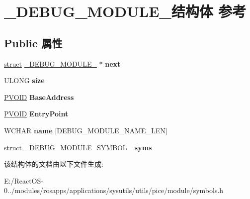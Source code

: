 \hypertarget{struct___d_e_b_u_g___m_o_d_u_l_e__}{}\section{\+\_\+\+D\+E\+B\+U\+G\+\_\+\+M\+O\+D\+U\+L\+E\+\_\+结构体 参考}
\label{struct___d_e_b_u_g___m_o_d_u_l_e__}
\subsection*{Public 属性}
\begin{DoxyCompactItemize}
\item 
\mbox{\label{struct___d_e_b_u_g___m_o_d_u_l_e___aa5464fefbaf71e010d2a32c072de102d}} 
\hyperlink{interfacestruct}{struct} \hyperlink{struct___d_e_b_u_g___m_o_d_u_l_e__}{\+\_\+\+D\+E\+B\+U\+G\+\_\+\+M\+O\+D\+U\+L\+E\+\_\+} $\ast$ {\bfseries next}
\item 
\mbox{\label{struct___d_e_b_u_g___m_o_d_u_l_e___aac00d4160cb70fcdde9198645df0fdfe}} 
U\+L\+O\+NG {\bfseries size}
\item 
\mbox{\label{struct___d_e_b_u_g___m_o_d_u_l_e___a6228229ceee699a762220bd3146210f0}} 
\hyperlink{interfacevoid}{P\+V\+O\+ID} {\bfseries Base\+Address}
\item 
\mbox{\label{struct___d_e_b_u_g___m_o_d_u_l_e___a4f01ec70de72798c318891be5a9b71a4}} 
\hyperlink{interfacevoid}{P\+V\+O\+ID} {\bfseries Entry\+Point}
\item 
\mbox{\label{struct___d_e_b_u_g___m_o_d_u_l_e___a9a3073ad12bb02b708a239aa9b93b957}} 
W\+C\+H\+AR {\bfseries name} \mbox{[}D\+E\+B\+U\+G\+\_\+\+M\+O\+D\+U\+L\+E\+\_\+\+N\+A\+M\+E\+\_\+\+L\+EN\mbox{]}
\item 
\mbox{\label{struct___d_e_b_u_g___m_o_d_u_l_e___a594ddff8af3f2b7a9f38f81c1a8568a9}} 
\hyperlink{interfacestruct}{struct} \hyperlink{struct___d_e_b_u_g___m_o_d_u_l_e___s_y_m_b_o_l__}{\+\_\+\+D\+E\+B\+U\+G\+\_\+\+M\+O\+D\+U\+L\+E\+\_\+\+S\+Y\+M\+B\+O\+L\+\_\+} {\bfseries syms}
\end{DoxyCompactItemize}


该结构体的文档由以下文件生成\+:\begin{DoxyCompactItemize}
\item 
E\+:/\+React\+O\+S-\/0../modules/rosapps/applications/sysutils/utils/pice/module/symbols.\+h\end{DoxyCompactItemize}
